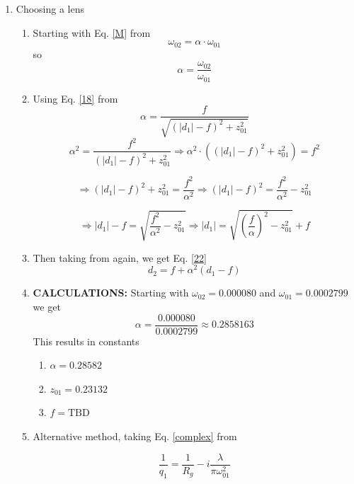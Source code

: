 \documentclass[11pt, letterpaper]{article}
\begin{document}
\begin{enumerate}
\begin{enumerate}
    
    \item Because the beam waist $\omega_{01} \approx 280~\mu\text{m}$ is the thinnest portion of the laser, the beam will only diverge and "scrape" the inside of the crystal. Therefore we need a focusing lens.


\end{enumerate}
\item Choosing a lens
\begin{enumerate}
\item Starting with Eq. \ref{M} from \cite{edmund}
\begin{equation}\label{M}
    \omega_{02}=\alpha\cdot\omega_{01}
\end{equation}
so $$\alpha=\frac{\omega_{02}}{\omega_{01}}$$
    \item Using Eq. \ref{18} from \cite{edmund} 
    \begin{equation}\label{18}
        \alpha = \frac{f}{\sqrt{(|d_1| - f)^2 + z_{01}^2}}
    \end{equation}
$$\alpha^2 = \frac{f^2}{(|d_1| - f)^2 + z_{01}^2}\Rightarrow \alpha^2 \cdot((|d_1| - f)^2 + z_{01}^2)= f^2$$

$$\Rightarrow(|d_1| - f)^2 + z_{01}^2= \frac{f^2}{\alpha^2}\Rightarrow (|d_1| - f)^2= \frac{f^2}{\alpha^2}-z_{01}^2$$

$$\Rightarrow |d_1| - f= \sqrt{\frac{f^2}{\alpha^2}-z_{01}^2}\Rightarrow |d_1|= \sqrt{\left(\frac{f}{\alpha}\right)^2-z_{01}^2}+f$$

\item Then taking from \cite{edmund} again, we get Eq. \ref{22}
\begin{equation}\label{22}
    d_2 = f + \alpha^2(d_1 - f)
\end{equation}   
\item \textbf{CALCULATIONS: }Starting with $\omega_{02}=0.000080$ and $\omega_{01}=0.0002799$ we get $$\alpha=\frac{0.000080}{0.0002799}\approx0.2858163$$ This results in constants 
\begin{enumerate}
    \item $\alpha=0.28582$
    \item $z_{01}=0.23132$
    \item $f=\text{TBD}$
\end{enumerate}
\item Alternative method, taking Eq. \ref{complex} from \cite{Osche}

\begin{equation}\label{complex}
    \frac{1}{q_1} = \frac{1}{R_{g}} - i\frac{\lambda}{\pi \omega_{01}^2}
\end{equation}


\end{enumerate}
\end{enumerate}
\end{document}
